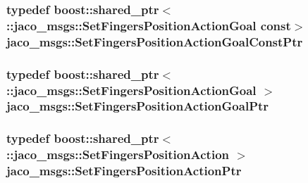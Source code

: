 \subsubsection[{\texorpdfstring{Set\+Fingers\+Position\+Action\+Goal\+Const\+Ptr}{SetFingersPositionActionGoalConstPtr}}]{\setlength{\rightskip}{0pt plus 5cm}typedef boost\+::shared\+\_\+ptr$<$ \+::{\bf jaco\+\_\+msgs\+::\+Set\+Fingers\+Position\+Action\+Goal} const$>$ {\bf jaco\+\_\+msgs\+::\+Set\+Fingers\+Position\+Action\+Goal\+Const\+Ptr}}\hypertarget{namespacejaco__msgs_ad2d28d9220bba6abe4251e4a990d0355}{}\label{namespacejaco__msgs_ad2d28d9220bba6abe4251e4a990d0355}
\subsubsection[{\texorpdfstring{Set\+Fingers\+Position\+Action\+Goal\+Ptr}{SetFingersPositionActionGoalPtr}}]{\setlength{\rightskip}{0pt plus 5cm}typedef boost\+::shared\+\_\+ptr$<$ \+::{\bf jaco\+\_\+msgs\+::\+Set\+Fingers\+Position\+Action\+Goal} $>$ {\bf jaco\+\_\+msgs\+::\+Set\+Fingers\+Position\+Action\+Goal\+Ptr}}\hypertarget{namespacejaco__msgs_a2ce95f08470d8c0e672a0baccd5fde5d}{}\label{namespacejaco__msgs_a2ce95f08470d8c0e672a0baccd5fde5d}
\subsubsection[{\texorpdfstring{Set\+Fingers\+Position\+Action\+Ptr}{SetFingersPositionActionPtr}}]{\setlength{\rightskip}{0pt plus 5cm}typedef boost\+::shared\+\_\+ptr$<$ \+::{\bf jaco\+\_\+msgs\+::\+Set\+Fingers\+Position\+Action} $>$ {\bf jaco\+\_\+msgs\+::\+Set\+Fingers\+Position\+Action\+Ptr}}\hypertarget{namespacejaco__msgs_a007ea2a48542f4a92183d76f1325ffa8}{}\label{namespacejaco__msgs_a007ea2a48542f4a92183d76f1325ffa8}
